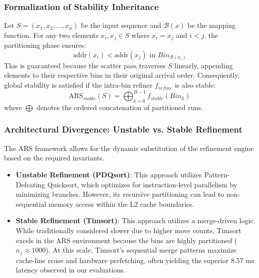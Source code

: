 \subsubsection{Formalization of Stability Inheritance}
Let $S = (x_1, x_2, \dots, x_n)$ be the input sequence and $\mathcal{B}(x)$ be the mapping function. For any two elements $x_i, x_j \in S$ where $x_i = x_j$ and $i < j$, the partitioning phase ensures:
\begin{equation}
\text{addr}(x_i) < \text{addr}(x_j) \text{ in } Bin_{\mathcal{B}(x_i)}
\end{equation}
This is guaranteed because the scatter pass traverses $S$ linearly, appending elements to their respective bins in their original arrival order. Consequently, global stability is satisfied if the intra-bin refiner $f_{refine}$ is also stable:
\begin{equation}
\text{ARS}_{stable}(S) = \bigoplus_{k=0}^{B-1} f_{stable}(Bin_k)
\end{equation}
where $\bigoplus$ denotes the ordered concatenation of partitioned runs.

\subsubsection{Architectural Divergence: Unstable vs. Stable Refinement}
The ARS framework allows for the dynamic substitution of the refinement engine based on the required invariants.
\begin{itemize}
    \item \textbf{Unstable Refinement (PDQsort)}: This approach utilizes Pattern-Defeating Quicksort, which optimizes for instruction-level parallelism by minimizing branches. However, its recursive partitioning can lead to non-sequential memory access within the L2 cache boundaries.
    \item \textbf{Stable Refinement (Timsort)}: This approach utilizes a merge-driven logic. While traditionally considered slower due to higher move counts, Timsort excels in the ARS environment because the bins are highly partitioned ($n_j \approx 1000$). At this scale, Timsort's sequential merge patterns maximize cache-line reuse and hardware prefetching, often yielding the superior 8.57 ms latency observed in our evaluations.
\end{itemize}



